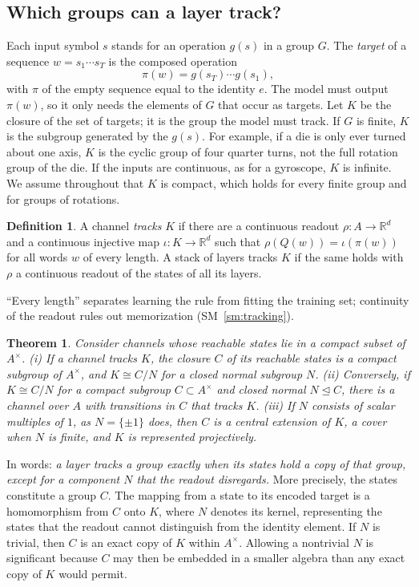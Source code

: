 \documentclass[aps,prx,reprint,superscriptaddress,longbibliography,nofootinbib,floatfix]{revtex4-2}
\newcommand{\RR}{\mathbb{R}}
\theoremstyle{plain}
\newtheorem{theorem}{Theorem}
\theoremstyle{definition}
\newtheorem{definition}{Definition}
\begin{document}
\subsection{Which groups can a layer track?}
Each input symbol $s$ stands for an operation $g(s)$ in a group $G$. The
\emph{target} of a sequence $w=s_1\cdots s_T$ is the composed operation
\[
\pi(w)=g(s_T)\cdots g(s_1),
\]
with $\pi$ of the empty sequence equal to the identity $e$. The model must
output $\pi(w)$, so it only needs the elements of $G$ that occur as targets.
Let $K$ be the closure of the set of targets; it is the group the model must
track. If $G$ is finite, $K$ is the subgroup generated by the $g(s)$. For
example, if a die is only ever turned about one axis, $K$ is the cyclic
group of four quarter turns, not the full rotation group of the die. If the
inputs are continuous, as for a gyroscope, $K$ is infinite. We assume
throughout that $K$ is compact, which holds for every finite group and for
groups of rotations.

\begin{definition}\label{def:tracking}
A channel \emph{tracks} $K$ if there are a continuous readout
$\rho\colon A\to\RR^d$ and a continuous injective map $\iota\colon K\to\RR^d$
such that $\rho(Q(w)) = \iota(\pi(w))$ for all words $w$ of every length.
A stack of layers tracks $K$ if the same holds with $\rho$ a continuous
readout of the states of all its layers.
\end{definition}

``Every length'' separates learning the rule from fitting the training set;
continuity of the readout rules out memorization (SM~\ref{sm:tracking}).

\begin{theorem}\label{thm:main}
Consider channels whose reachable states lie in a compact subset of
$A^\times$. (i) If a channel tracks $K$, the closure $C$ of its reachable
states is a compact subgroup of $A^\times$, and $K\cong C/N$ for a closed
normal subgroup $N$. (ii) Conversely, if $K\cong C/N$ for a compact subgroup
$C\subset A^\times$ and closed normal $N\trianglelefteq C$, there is a
channel over $A$ with transitions in $C$ that tracks $K$.
(iii) If $N$ consists of scalar multiples of $1$, as $N=\{\pm1\}$ does,
then $C$ is a central extension of $K$, a cover when $N$ is finite, and $K$
is represented \emph{projectively}.
\end{theorem}

In words: \emph{a layer tracks a group exactly when its states hold a copy
of that group, except for a component $N$ that the readout disregards.} More precisely, the states constitute a group $C$. The mapping from a state to its encoded target is a homomorphism from $C$ onto $K$, where $N$ denotes its kernel, representing the states that the readout cannot distinguish from the identity element. If $N$ is trivial, then $C$ is an exact copy of $K$ within $A^\times$. Allowing a nontrivial $N$ is significant because $C$ may then be embedded in a smaller algebra than any exact copy of $K$ would permit.
\end{document}
